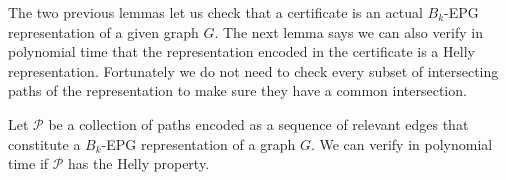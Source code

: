 \documentclass[runningheads]{llncs}
\begin{document}
 

The two previous lemmas let us check that a certificate is an actual $B_k$-EPG representation of a given graph $G$.  The next lemma says we can also verify in polynomial time that the representation encoded in the certificate is a Helly representation. Fortunately we do not need to check every subset of intersecting paths  of the representation to make sure they have a common intersection. 


\begin{lemma}\label{lem:verify3}
Let $\mathcal{P}$ be a collection of paths encoded as a sequence of relevant edges that constitute a  $B_k$-EPG representation of a graph $G$. We can verify in polynomial time if $\mathcal{P}$ has the Helly property.
\end{lemma}
\end{document}
